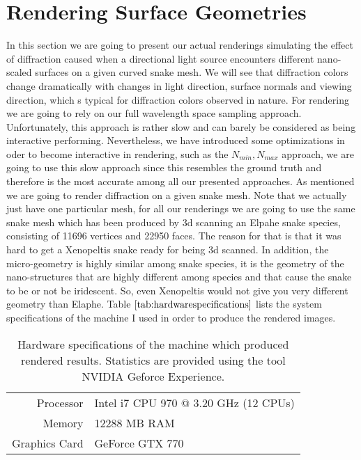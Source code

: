 \section{Rendering Surface Geometries}
\label{sec:snakegeomrenderings}
In this section we are going to present our actual renderings simulating the effect of diffraction caused when a directional light source encounters different nano-scaled surfaces on a given curved snake mesh. We will see that diffraction colors change dramatically with changes in light direction, surface normals and viewing direction, which s typical for diffraction colors observed in nature. For rendering we are going to rely on our full wavelength space sampling approach. Unfortunately, this approach is rather slow and can barely be considered as being interactive performing. Nevertheless, we have introduced some optimizations in oder to become interactive in rendering, such as the $N_{min}, N_{max}$ approach, we are going to use this slow approach since this resembles the ground truth and therefore is the most accurate among all our presented approaches. As mentioned we are going to render diffraction on a given snake mesh. Note that we actually just have one particular mesh, for all our renderings we are going to use the same snake mesh which has been produced by 3d scanning an Elpahe snake species, consisting of 11696 vertices and 22950 faces. The reason for that is that it was hard to get a Xenopeltis snake ready for being 3d scanned. In addition, the micro-geometry is highly similar among snake species, it is the geometry of the nano-structures that are highly different among species and that cause the snake to be or not be iridescent. So, even Xenopeltis would not give you very different geometry than Elaphe. Table $\ref{tab:hardwarespecifications}$ lists the system specifications of the machine I used in order to produce the rendered images.

\begin{table}[H]
  \centering
  \begin{tabular}{|r|l|}
    \hline
    Processor & Intel i7 CPU 970 @ 3.20 GHz (12 CPUs) \\
    Memory & 12288 MB RAM \\
    Graphics Card & GeForce GTX 770 \\
    \hline  
  \end{tabular}
\caption[Hardware Specifications]{Hardware specifications of the machine which produced rendered results. Statistics are provided using the tool NVIDIA Geforce Experience.}
\label{tab:hardwarespecifications}
\end{table}

